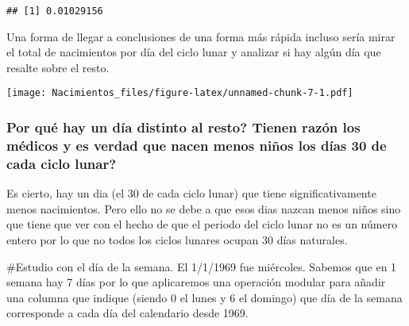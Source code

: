 \documentclass[
]{article}
\newenvironment{Shaded}{\begin{snugshade}}{\end{snugshade}}
\newcommand{\CommentTok}[1]{\textcolor[rgb]{0.56,0.35,0.01}{\textit{#1}}}
\newcommand{\ControlFlowTok}[1]{\textcolor[rgb]{0.13,0.29,0.53}{\textbf{#1}}}
\newcommand{\DecValTok}[1]{\textcolor[rgb]{0.00,0.00,0.81}{#1}}
\newcommand{\FunctionTok}[1]{\textcolor[rgb]{0.00,0.00,0.00}{#1}}
\newcommand{\NormalTok}[1]{#1}
\newcommand{\OtherTok}[1]{\textcolor[rgb]{0.56,0.35,0.01}{#1}}
\newcommand{\SpecialCharTok}[1]{\textcolor[rgb]{0.00,0.00,0.00}{#1}}
\begin{document}
\begin{verbatim}
## [1] 0.01029156
\end{verbatim}

Una forma de llegar a conclusiones de una forma más rápida incluso sería
mirar el total de nacimientos por día del ciclo lunar y analizar si hay
algún día que resalte sobre el resto.

\begin{Shaded}
\end{Shaded}

\texttt{[image: Nacimientos\_files/figure-latex/unnamed-chunk-7-1.pdf]}

\hypertarget{por-quuxe9-hay-un-duxeda-distinto-al-resto-tienen-razuxf3n-los-muxe9dicos-y-es-verdad-que-nacen-menos-niuxf1os-los-duxedas-30-de-cada-ciclo-lunar}{%
\subsubsection{Por qué hay un día distinto al resto? Tienen razón los
médicos y es verdad que nacen menos niños los días 30 de cada ciclo
lunar?}\label{por-quuxe9-hay-un-duxeda-distinto-al-resto-tienen-razuxf3n-los-muxe9dicos-y-es-verdad-que-nacen-menos-niuxf1os-los-duxedas-30-de-cada-ciclo-lunar}}

Es cierto, hay un dia (el 30 de cada ciclo lunar) que tiene
significativamente menos nacimientos. Pero ello no se debe a que esos
dias nazcan menos niños sino que tiene que ver con el hecho de que el
periodo del ciclo lunar no es un número entero por lo que no todos los
ciclos lunares ocupan 30 días naturales.

\#Estudio con el día de la semana. El 1/1/1969 fue miércoles. Sabemos
que en 1 semana hay 7 días por lo que aplicaremos una operación modular
para añadir una columna que indique (siendo 0 el lunes y 6 el domingo)
que día de la semana corresponde a cada día del calendario desde 1969.
\end{document}
